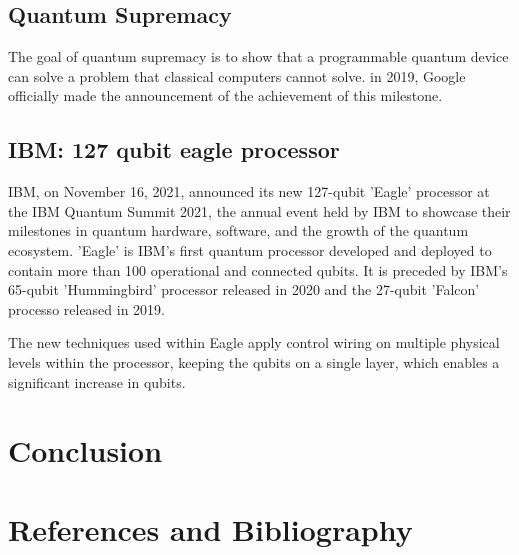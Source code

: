 \documentclass{article}
\begin{document}
\subsection{Quantum Supremacy}
The goal of quantum supremacy is to show that a programmable quantum device can solve a problem that classical computers cannot solve. in 2019, Google officially made the announcement of the achievement of this milestone.  


\subsection{IBM: 127 qubit eagle processor}
IBM, on November 16, 2021, announced its new 127-qubit 'Eagle' processor at the IBM Quantum Summit 2021, the annual event held by IBM to showcase their milestones in quantum hardware, software, and the growth of the quantum ecosystem. 'Eagle' is IBM's first quantum processor developed and deployed to contain more than 100 operational and connected qubits. It is preceded by IBM's 65-qubit 'Hummingbird' processor released in 2020 and the 27-qubit 'Falcon' processo released in 2019.

\noindent
The new techniques used within Eagle apply control wiring on multiple physical levels within the processor, keeping the qubits on a single layer, which enables a significant increase in qubits.

\pagebreak
\section{Conclusion} %

\pagebreak
\section{References and Bibliography}
\printbibliography[heading=none]
\end{document}
